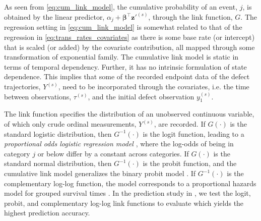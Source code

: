 As seen from \cref{eq:cum_link_model}, the cumulative probability of an event, $j$, is obtained by the linear predictor, $\alpha_j + \bm{\beta}^\top \bm{z}'^{(s)}$, through the link function, $G$.
The regression setting in \cref{eq:cum_link_model} is somewhat related to that of the regression in \cref{eq:trans_rates_covariates} as there is some base rate (or intercept) that is scaled (or added) by the covariate contribution, all mapped through some transformation of exponential family. %
The cumulative link model is static in terms of temporal dependency. Further, it has no intrinsic formulation of state dependence. This implies that some of the recorded endpoint data of the defect trajectories, $Y^{(s)}$, need to be incorporated through the covariates, i.e. the time between observations, $\tau^{(s)}$, and the initial defect observation $y_1^{(s)}$. %

The link function specifies the distribution of an unobserved continuous variable, of which only crude ordinal measurements, $Y^{(s)}$, are recorded. If $G(\cdot)$ is the standard logistic distribution, then $G^{-1}(\cdot)$ is the logit function, leading to a \textit{proportional odds logistic regression model} \citep{mccullagh1980a}, where the log-odds of being in category $j$ or below differ by a constant across categories.
If $G(\cdot)$ is the standard normal distribution, then $G^{-1}(\cdot)$ is the probit function, and the cumulative link model generalizes the binary probit model \citep{agresti2012}.
If $G^{-1}(\cdot)$ is the complementary log-log function, the model corresponds to a proportional hazards model for grouped survival times \citep{Christensen2023}.
In the prediction study in , we test the logit, probit, and complementary log-log link functions to evaluate which yields the highest prediction accuracy.


